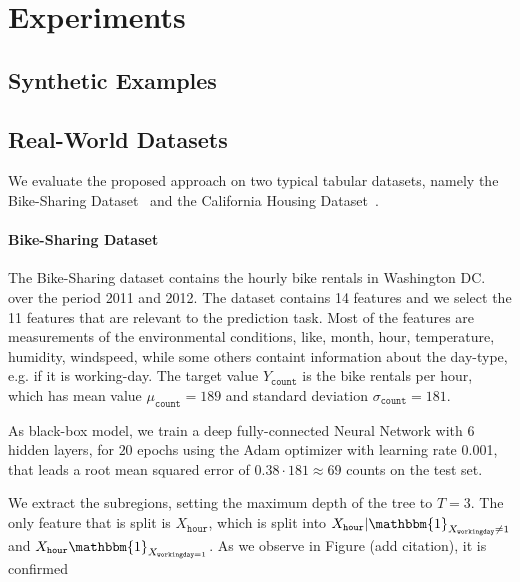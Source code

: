 \documentclass[12pt]{article}
\newcommand{\when}[1]{\mathbbm{1}_{#1}}
\begin{document}
\section{Experiments}

\subsection{Synthetic Examples}

\subsection{Real-World Datasets}

We evaluate the proposed approach on two typical tabular datasets, namely the Bike-Sharing Dataset~\citep{misc_bike_sharing_dataset_275}
and the California Housing Dataset~\citep{pace1997sparse}.

\paragraph{Bike-Sharing Dataset}

The Bike-Sharing dataset contains the hourly bike rentals in Washington DC. over the period 2011 and 2012.
The dataset contains 14 features and we select the 11 features that are relevant to the prediction task.
Most of the features are measurements of the environmental conditions, like,
month, hour, temperature, humidity, windspeed, while some others containt information about the
day-type, e.g. if it is working-day.
The target value \( Y_{\mathtt{count}}\) is the bike rentals per hour, which has mean value
\(\mu_{\mathtt{count}} = 189\) and standard deviation \(\sigma_{\mathtt{count}} = 181\).

As black-box model, we train a deep fully-connected Neural Network with 6 hidden layers,
for \(20\) epochs using the Adam optimizer with learning rate 0.001, that
leads a root mean squared error of \( 0.38 \cdot 181 \approx 69\) counts on the test set.

We extract the subregions, setting the maximum depth of the tree to \(T=3\).
The only feature that is split is $X_{\mathtt{hour}}$, which is split into $X_{\mathtt{hour}} | \when{X_{\mathtt{workingday}} \neq 1}$ and $X_{\mathtt{hour}} \when{X_{\mathtt{workingday} = 1}}$.
As we observe in Figure (add citation), it is confirmed
\end{document}
